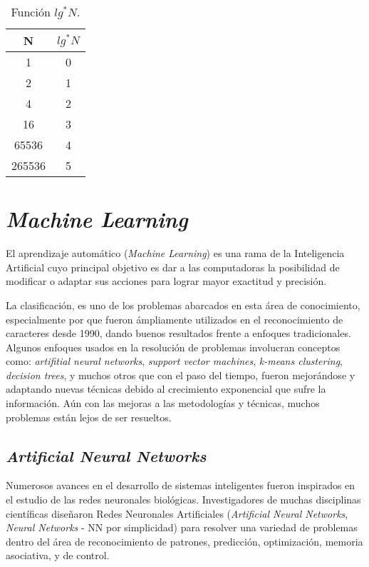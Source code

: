 \begin{table}[h!]
  \centering
  \begin{tabular}{|c|c|}
    \hline 
    N & $lg^*N$ \\ 
	  \hline
		1 & 0 \\	  
		2 & 1 \\
		4 & 2 \\		
		16 & 3 \\		
		65536 & 4 \\		
		265536 & 5 \\
	  \hline
  \end{tabular}
  \caption{Función $lg^*N$.}
  \label{Tab:Cap-marcoteorico:lg*n}
\end{table}

\nocite{UF:proof2}

\section{\textit{Machine Learning}}
	El aprendizaje automático (\textit{Machine Learning}) es una rama de la 
	Inteligencia Artificial cuyo principal objetivo es dar a las computadoras la
	posibilidad de modificar o adaptar sus acciones para lograr mayor exactitud 
	y precisión.
	
	La clasificación, es uno de los problemas abarcados en esta área de 
	conocimiento, especialmente por que fueron ámpliamente utilizados en el 
	reconocimiento de caracteres desde 1990, dando buenos resultados frente a 
	enfoques tradicionales. Algunos enfoques usados en la resolución de
	problemas involucran conceptos como: \textit{artifitial neural networks},
	\textit{support vector machines}, \textit{k-means clustering},
	\textit{decision trees}, y muchos otros que con el paso del tiempo, fueron
	mejorándose y adaptando nuevas técnicas debido al crecimiento exponencial 
	que sufre la información. Aún con las mejoras a las metodologías y técnicas,
	muchos problemas están lejos de ser resueltos.

\subsection{\textit{Artificial Neural Networks}}
Numerosos avances en el desarrollo de sistemas inteligentes fueron inspirados 
en el estudio de las redes neuronales biológicas. Investigadores de muchas 
disciplinas científicas diseñaron Redes Neuronales Artificiales 
(\textit{Artificial Neural Networks}, \textit{Neural Networks} - NN por 
simplicidad) para resolver una variedad de problemas dentro del área de 
reconocimiento de patrones, predicción, optimización, memoria asociativa, y de
control.

